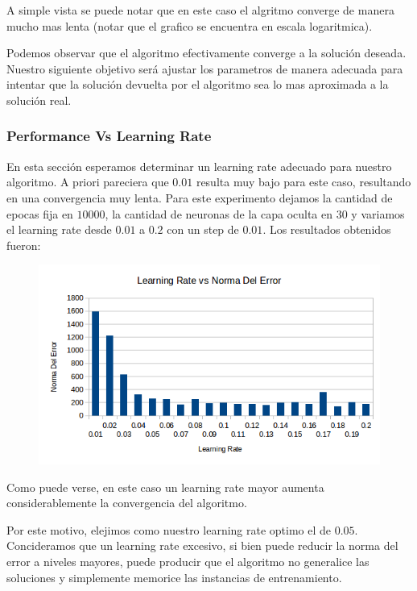 A simple vista se puede notar que en este caso el algritmo converge de manera mucho mas lenta (notar que el grafico se encuentra en escala logaritmica).

Podemos observar que el algoritmo efectivamente converge a la solución deseada. Nuestro siguiente objetivo será ajustar los parametros de manera adecuada para intentar que la solución devuelta por el algoritmo sea lo mas aproximada a la solución real.

\subsubsection{Performance Vs Learning Rate}

En esta sección esperamos determinar un learning rate adecuado para nuestro algoritmo. A priori pareciera que $0.01$ resulta muy bajo para este caso, resultando en una convergencia muy lenta. Para este experimento dejamos la cantidad de epocas fija en $10000$, la cantidad de neuronas de la capa oculta en $30$ y variamos el learning rate desde $0.01$ a $0.2$ con un step de $0.01$. Los resultados obtenidos fueron:

\begin{figure}[h!]
  \centering
    \includegraphics[scale=0.4]{ej2/test_learning_rate.png}
\end{figure}

Como puede verse, en este caso un learning rate mayor aumenta considerablemente la convergencia del algoritmo.

Por este motivo, elejimos como nuestro learning rate optimo el de $0.05$. Concideramos que un learning rate excesivo, si bien puede reducir la norma del error a niveles mayores, puede producir que el algoritmo no generalice las soluciones y simplemente memorice las instancias de entrenamiento.

